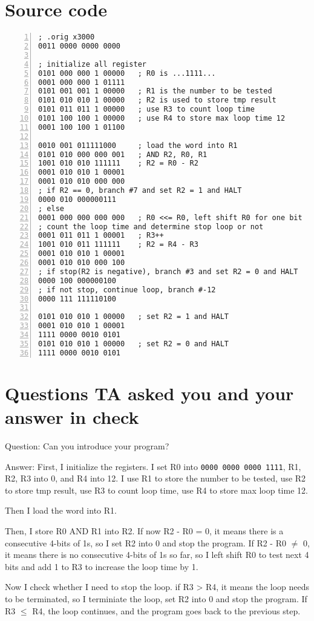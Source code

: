 \documentclass[a4paper, 12pt]{article}
\begin{document}
\section{Source code}
\linespread{0.9}      %
\begin{Verbatim}[frame = single, numbers = left]
; .orig x3000
0011 0000 0000 0000

; initialize all register
0101 000 000 1 00000   ; R0 is ...1111...
0001 000 000 1 01111
0101 001 001 1 00000   ; R1 is the number to be tested
0101 010 010 1 00000   ; R2 is used to store tmp result
0101 011 011 1 00000   ; use R3 to count loop time
0101 100 100 1 00000   ; use R4 to store max loop time 12
0001 100 100 1 01100

0010 001 011111000     ; load the word into R1
0101 010 000 000 001   ; AND R2, R0, R1
1001 010 010 111111    ; R2 = R0 - R2
0001 010 010 1 00001
0001 010 010 000 000
; if R2 == 0, branch #7 and set R2 = 1 and HALT
0000 010 000000111
; else
0001 000 000 000 000   ; R0 <<= R0, left shift R0 for one bit
; count the loop time and determine stop loop or not
0001 011 011 1 00001   ; R3++
1001 010 011 111111    ; R2 = R4 - R3
0001 010 010 1 00001
0001 010 010 000 100
; if stop(R2 is negative), branch #3 and set R2 = 0 and HALT
0000 100 000000100
; if not stop, continue loop, branch #-12
0000 111 111110100

0101 010 010 1 00000   ; set R2 = 1 and HALT
0001 010 010 1 00001
1111 0000 0010 0101
0101 010 010 1 00000   ; set R2 = 0 and HALT
1111 0000 0010 0101
\end{Verbatim}
\linespread{0.9}      %

\section{Questions TA asked you and your answer in check}
Question: Can you introduce your program?

Answer: First, I initialize the registers. I set R0 into \verb|0000 0000 0000 1111|, R1, R2, R3 into 0, and R4 into 12. I use R1 to store the number to be tested, use R2 to store tmp result, use R3 to count loop time, use R4 to store max loop time 12.

Then I load the word into R1.

Then, I store R0 AND R1 into R2. If now R2 - R0 = 0, it means there is a consecutive 4-bits of 1s, so I set R2 into 0 and stop the program. If R2 - R0 $\neq$ 0, it means there is no consecutive 4-bits of 1s so far, so I left shift R0 to test next 4 bits and add 1 to R3 to increase the loop time by 1.

Now I check whether I need to stop the loop. if R3 > R4, it means the loop needs to be terminated, so I terminiate the loop, set R2 into 0 and stop the program. If R3 $\leq$ R4, the loop continues, and the program goes back to the previous step.
\end{document}
